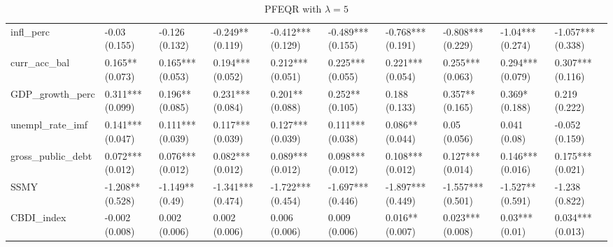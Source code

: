 \begin{table}[H]
\begin{adjustbox}{totalheight=2.5in, width=\columnwidth }
\begin{subtable}[c]{1.1\textwidth}
{\begin{tabular}{llllllllll}
  infl\_perc & -0.03 (0.155) & -0.126 (0.132) & -0.249** (0.119) & -0.412*** (0.129) & -0.489*** (0.155) & -0.768*** (0.191) & -0.808*** (0.229) & -1.04*** (0.274) & -1.057*** (0.338) \\ 
  curr\_acc\_bal & 0.165** (0.073) & 0.165*** (0.053) & 0.194*** (0.052) & 0.212*** (0.051) & 0.225*** (0.055) & 0.221*** (0.054) & 0.255*** (0.063) & 0.294*** (0.079) & 0.307*** (0.116) \\ 
  GDP\_growth\_perc & 0.311*** (0.099) & 0.196** (0.085) & 0.231*** (0.084) & 0.201** (0.088) & 0.252** (0.105) & 0.188 (0.133) & 0.357** (0.165) & 0.369* (0.188) & 0.219 (0.222) \\ 
  unempl\_rate\_imf & 0.141*** (0.047) & 0.111*** (0.039) & 0.117*** (0.039) & 0.127*** (0.039) & 0.111*** (0.038) & 0.086** (0.044) & 0.05 (0.056) & 0.041 (0.08) & -0.052 (0.159) \\ 
  gross\_public\_debt & 0.072*** (0.012) & 0.076*** (0.012) & 0.082*** (0.012) & 0.089*** (0.012) & 0.098*** (0.012) & 0.108*** (0.012) & 0.127*** (0.014) & 0.146*** (0.016) & 0.175*** (0.021) \\ 
  SSMY & -1.208** (0.528) & -1.149** (0.49) & -1.341*** (0.474) & -1.722*** (0.454) & -1.697*** (0.446) & -1.897*** (0.449) & -1.557*** (0.501) & -1.527** (0.591) & -1.238 (0.822) \\ 
  CBDI\_index & -0.002 (0.008) & 0.002 (0.006) & 0.002 (0.006) & 0.006 (0.006) & 0.009 (0.006) & 0.016** (0.007) & 0.023*** (0.008) & 0.03*** (0.01) & 0.034*** (0.013) \\ 
   \bottomrule
\end{tabular}}
\end{subtable}
\end{adjustbox}
\\
 \begin{adjustbox}{totalheight=2.5in, width=\columnwidth } 
\begin{subtable}[c]{1.1\textwidth}
\caption{PFEQR with $\lambda = 5$}
\centering
{}
\end{subtable}
\end{adjustbox}
\end{table}
